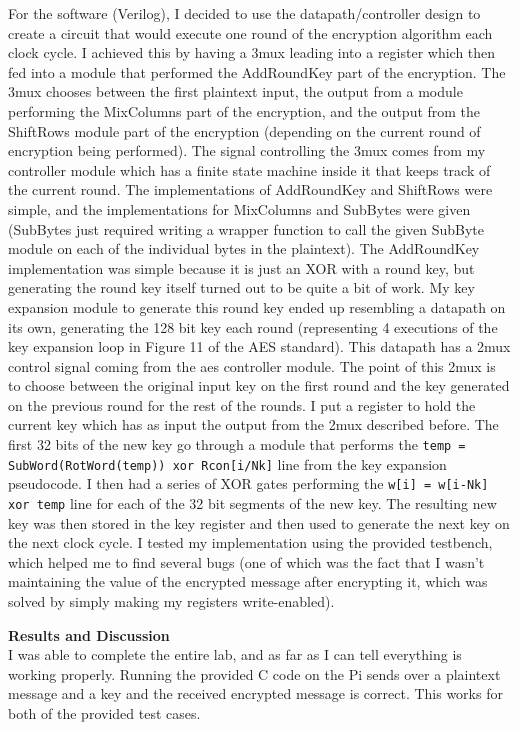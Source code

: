 \documentclass[11pt,letterpaper]{article}
\begin{document}
For the software (Verilog), I decided to use the datapath/controller design to create a circuit that would execute one round of the encryption algorithm each clock cycle. I achieved this by having a 3mux leading into a register which then fed into a module that performed the AddRoundKey part of the encryption. The 3mux chooses between the first plaintext input, the output from a module performing the MixColumns part of the encryption, and the output from the ShiftRows module part of the encryption (depending on the current round of encryption being performed). The signal controlling the 3mux comes from my controller module which has a finite state machine inside it that keeps track of the current round. The implementations of AddRoundKey and ShiftRows were simple, and the implementations for MixColumns and SubBytes were given (SubBytes just required writing a wrapper function to call the given SubByte module on each of the individual bytes in the plaintext). The AddRoundKey implementation was simple because it is just an XOR with a round key, but generating the round key itself turned out to be quite a bit of work. My key expansion module to generate this round key ended up resembling a datapath on its own, generating the 128 bit key each round (representing 4 executions of the key expansion loop in Figure 11 of the AES standard). This datapath has a 2mux control signal coming from the aes controller module. The point of this 2mux is to choose between the original input key on the first round and the key generated on the previous round for the rest of the rounds. I put a register to hold the current key which has as input the output from the 2mux described before. The first 32 bits of the new key go through a module that performs the \verb|temp = SubWord(RotWord(temp)) xor Rcon[i/Nk]| line from the key expansion pseudocode. I then had a series of XOR gates performing the \verb|w[i] = w[i-Nk] xor temp| line for each of the 32 bit segments of the new key. The resulting new key was then stored in the key register and then used to generate the next key on the next clock cycle. I tested my implementation using the provided testbench, which helped me to find several bugs (one of which was the fact that I wasn't maintaining the value of the encrypted message after encrypting it, which was solved by simply making my registers write-enabled).





\noindent\textbf{Results and Discussion}\\
I was able to complete the entire lab, and as far as I can tell everything is working properly. Running the provided C code on the Pi sends over a plaintext message and a key and the received encrypted message is correct. This works for both of the provided test cases.
\end{document}
